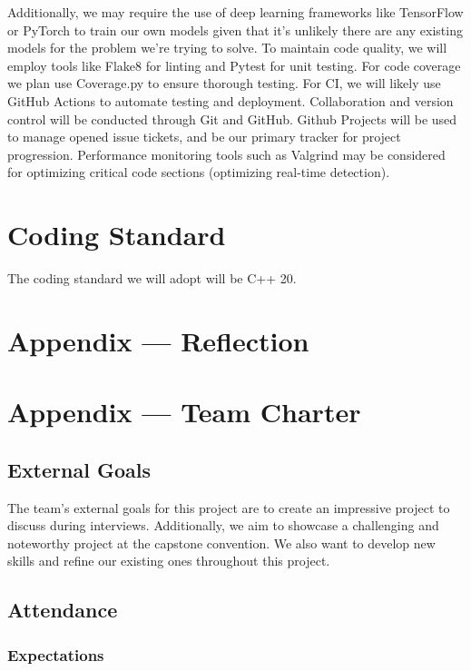 \documentclass{article}
\begin{document}
Additionally, we may require the use of deep learning frameworks like TensorFlow or PyTorch to train our own models given that it's unlikely there are any existing models for the problem we're trying to solve.
To maintain code quality, we will employ tools like Flake8 for linting and Pytest for unit testing. 
For code coverage we plan use Coverage.py to ensure thorough testing.
For CI, we will likely use GitHub Actions to automate testing and deployment.
Collaboration and version control will be conducted through Git and GitHub. Github Projects will be used to manage opened issue tickets, and be our primary tracker for project progression.
Performance monitoring tools such as Valgrind may be considered for optimizing critical code sections (optimizing real-time detection). 

\section{Coding Standard}
The coding standard we will adopt will be C++ 20. 

\newpage{}

\section*{Appendix --- Reflection}



\newpage{}

\section*{Appendix --- Team Charter}

\subsection*{External Goals}

The team's external goals for this project are to create an impressive project
to discuss during interviews. Additionally, we aim to showcase a challenging
and noteworthy project at the capstone convention. We also want to develop new skills 
and refine our existing ones throughout this project.

\subsection*{Attendance}

\subsubsection*{Expectations}
\end{document}
